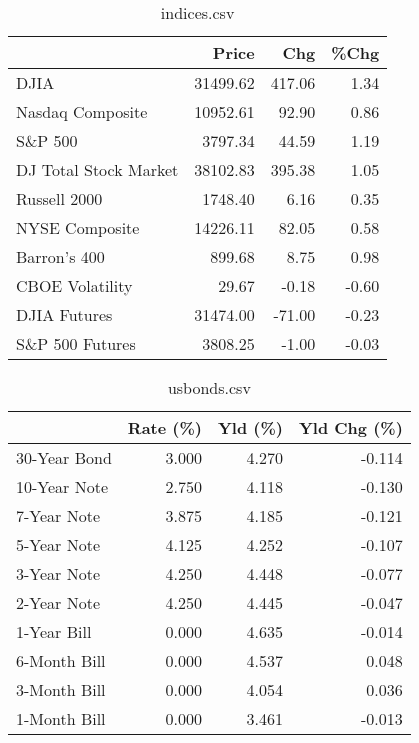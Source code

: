 \documentclass{article}%
\begin{document}
%


\begin{table}[htbp]%
\caption{indices.csv}%
\centering%
\begin{adjustbox}{width=1\textwidth}%
\begin{tabular}{lrrr}
\toprule
                      &    Price &    Chg &  \%Chg \\
\midrule
                 DJIA & 31499.62 & 417.06 &  1.34 \\
     Nasdaq Composite & 10952.61 &  92.90 &  0.86 \\
              S\&P 500 &  3797.34 &  44.59 &  1.19 \\
DJ Total Stock Market & 38102.83 & 395.38 &  1.05 \\
         Russell 2000 &  1748.40 &   6.16 &  0.35 \\
       NYSE Composite & 14226.11 &  82.05 &  0.58 \\
         Barron's 400 &   899.68 &   8.75 &  0.98 \\
      CBOE Volatility &    29.67 &  -0.18 & -0.60 \\
         DJIA Futures & 31474.00 & -71.00 & -0.23 \\
      S\&P 500 Futures &  3808.25 &  -1.00 & -0.03 \\
\bottomrule
\end{tabular}
%
\end{adjustbox}%
\end{table}

%


\begin{table}[htbp]%
\caption{usbonds.csv}%
\centering%
\begin{adjustbox}{width=1\textwidth}%
\begin{tabular}{lrrr}
\toprule
             &  Rate (\%) &  Yld (\%) &  Yld Chg (\%) \\
\midrule
30-Year Bond &     3.000 &    4.270 &       -0.114 \\
10-Year Note &     2.750 &    4.118 &       -0.130 \\
 7-Year Note &     3.875 &    4.185 &       -0.121 \\
 5-Year Note &     4.125 &    4.252 &       -0.107 \\
 3-Year Note &     4.250 &    4.448 &       -0.077 \\
 2-Year Note &     4.250 &    4.445 &       -0.047 \\
 1-Year Bill &     0.000 &    4.635 &       -0.014 \\
6-Month Bill &     0.000 &    4.537 &        0.048 \\
3-Month Bill &     0.000 &    4.054 &        0.036 \\
1-Month Bill &     0.000 &    3.461 &       -0.013 \\
\bottomrule
\end{tabular}
%
\end{adjustbox}%
\end{table}
\end{document}
